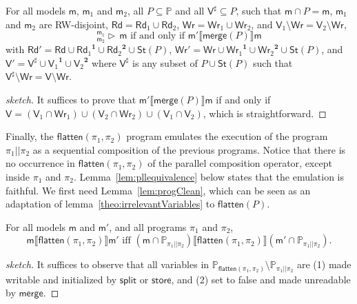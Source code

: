 \documentclass{llncs}
\newcommand{\progStore}{\mathsf{store}}
\newcommand{\progsplit}{\mathsf{split}}
\newcommand{\progmerge}{\mathsf{merge}}
\newcommand{\progFlatten}{\mathsf{flatten}}
\newcommand{\cp}[2]{{#2}^\mathbf{#1}}
\newcommand{\modl}{\mathsf m}
\newcommand{\mrg}[3]{ ^{#2}_{#3} \triangleright \, #1 }
\newcommand{\pll}{ {||} }							%
\newcommand{\readset}{\mathsf{Rd}}
\newcommand{\valuset}{\mathsf{V}}
\newcommand{\writeset}{\mathsf{Wr}}
\newcommand{\storeset}{\mathsf{St}}
\newcommand{\intPgm}[1]{\llbracket #1 \rrbracket}
\newcommand{\propset}{\mathbb P}
\newcommand{\propsetOf}[1]{\propset_{#1}}
\newcommand{\modinter}{\cap}
\begin{document}
\begin{lemma}\label{lem:progmerge}
For all models $\modl$, $\modl_1$ and $\modl_2$, all $P \subseteq \propset$ and all $\valuset^\sharp \subseteq P$,
such that $\modl \modinter P = \modl$,
        $\modl_1$ and $\modl_2$ are RW-disjoint,
        $\readset = \readset_1 \cup \readset_2$,
        $\writeset = \writeset_1 \cup \writeset_2$, and
        $\valuset_1 \setminus \writeset = \valuset_2 \setminus \writeset$,
$$\mrg \modl {\modl_1} {\modl_2} \text{ if and only if }
\modl' \intPgm{\progmerge(P)} \modl$$ with
$\readset' = \readset \cup \cp 1 {\readset_1} \cup \cp 2 {\readset_2} \cup \storeset(P)$,
$\writeset' = \writeset \cup \cp 1 {\writeset_1} \cup \cp 2 {\writeset_2} \cup \storeset(P)$, and
$\valuset' = \valuset^\sharp \cup \cp 1 {\valuset_1} \cup \cp 2 {\valuset_2}$
where $\valuset^\sharp$ is any subset of $P \cup \storeset(P)$ such that
$\valuset^\sharp \setminus \writeset = \valuset \setminus \writeset$.
\end{lemma}
\begin{proof}[sketch]
It suffices to prove that
$\modl' \intPgm{\progmerge(P)} \modl$ if and only if
$\valuset = (\valuset_1 \cap \writeset_1) \cup (\valuset_2 \cap \writeset_2) \cup (\valuset_1 \cap \valuset_2) $,
which is straightforward.
\end{proof}

Finally, the $\progFlatten(\pi_1, \pi_2)$ program emulates the execution of the program $\pi_1 \pll \pi_2$ as
a sequential composition of the previous programs.
Notice that there is no occurrence in $\progFlatten(\pi_1, \pi_2)$ of the parallel composition operator,
except inside $\pi_1$ and $\pi_2$.
Lemma~\ref{lem:pllequivalence} below states that the emulation is faithful.
We first need Lemma~\ref{lem:progClean},
which can be seen as an adaptation of lemma~\ref{theo:irrelevantVariables} to $\progFlatten(P)$.

\begin{lemma}\label{lem:progClean}
For all models $\modl$ and $\modl'$, and all programs $\pi_1$ and $\pi_2$,
$$
\modl \intPgm{\progFlatten(\pi_1,\pi_2)} \modl' \text{ iff }
(\modl \modinter \propsetOf{\pi_1 \pll \pi_2}) \intPgm{\progFlatten(\pi_1, \pi_2)} (\modl' \modinter \propsetOf{\pi_1 \pll \pi_2}).
$$
\end{lemma}
\begin{proof}[sketch]
It suffices to observe that all variables in $\propsetOf{\progFlatten(\pi_1, \pi_2)} \setminus \propsetOf{\pi_1 \pll \pi_2}$ are 
(1) made writable and initialized by $\progsplit$ or $\progStore$, and 
(2) set to false and made unreadable by $\progmerge$.
\end{proof}
\end{document}
